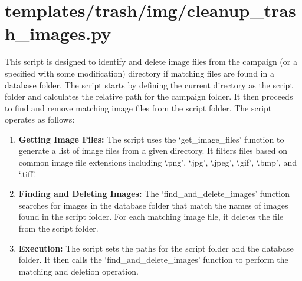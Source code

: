 \section{templates/trash/img/cleanup\_trash\_images.py}

This script is designed to identify and delete image files from the campaign (or a specified with some modification) directory if matching files are found in a database folder. The script starts by defining the current directory as the script folder and calculates the relative path for the campaign folder. It then proceeds to find and remove matching image files from the script folder. The script operates as follows:

\begin{enumerate}
    \item \textbf{Getting Image Files:} The script uses the `get\_image\_files' function to generate a list of image files from a given directory. It filters files based on common image file extensions including `.png', `.jpg', `.jpeg', `.gif', `.bmp', and `.tiff'.
    
    \item \textbf{Finding and Deleting Images:} The `find\_and\_delete\_images' function searches for images in the database folder that match the names of images found in the script folder. For each matching image file, it deletes the file from the script folder.
    
    \item \textbf{Execution:} The script sets the paths for the script folder and the database folder. It then calls the `find\_and\_delete\_images' function to perform the matching and deletion operation.
\end{enumerate}








